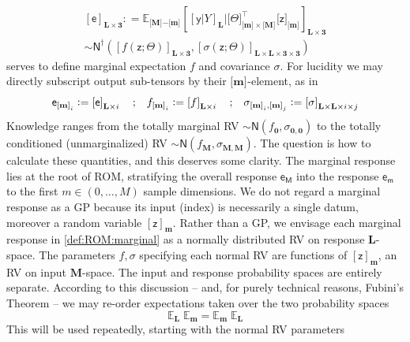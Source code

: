 \documentclass[preprint,12pt]{elsarticle}
\newcommand*{\M}[1]{\ensuremath{#1}\xspace}
\newcommand*{\x}{\times}
\newcommand*{\mi}[1]{\mathbf{#1}}
\newcommand*{\rv}[1]{\mathsf{#1}}
\newcommand*{\te}[2][]{\left\lbrack{#2}\right\rbrack_{#1}}
\newcommand*{\tte}[2][]{\lbrack{#2}\rbrack_{#1}}
\newcommand*{\tse}[2][]{\mi{\lbrack#2\rbrack}_{#1}}
\newcommand*{\tme}[3][]{\lbrack{#3}\rbrack_{\tse[#1]{#2}}}
\newcommand*{\deq}{\M{\mathrel{\mathop:}=}}
\newcommand{\T}[1]{\text{#1}}
\newcommand*{\QT}[2][]{\M{\quad\T{#2}\ifthenelse{\equal{#1}{}}{\quad}{#1}}}
\newcommand*{\evt}[3][]{\mathbb{E}_{#3}^{#1}\!#2}
\newcommand*{\tgauss}[2]{\mathsf{N}({#1,#2})}
\newcommand*{\gaussd}[2]{\mathsf{N}^{\dagger}\!\left({#1,#2}\right)}
\begin{document}
        \begin{multline} \label{def:ROM:marginal}
            \te[\mi{L\x \mi{3}}]{\rv{e}} \deq \evt{\te[\mi{L\x 3}]{\te[\mi{L}]{\rv{y} \vert Y}
            \big\vert \tte[\tse{m}\x\tse{M}]{\Theta}^{\intercal} \tme{m}{\rv{z}}}}{\tse{M}\mi{-}\tse{m}} \\
            \sim \gaussd{\te[\mi{L\x 3}]{f(\rv{z}; \Theta)}}
            {\te[\mi{L\x L\x 3\x 3}]{\sigma(\rv{z}; \Theta)}}
        \end{multline}
        serves to define marginal expectation $f$ and covariance $\sigma$.
        For lucidity we may directly subscript output sub-tensors by their $\tse{m}$-element, as in
        \begin{equation*}
            {\rv{e}_{\tse[i]{m}}}\deq \te[\mi{L}\x i]{\rv{e}} \QT{;}
            {f_{\tse[i]{m}}}\deq \te[\mi{L}\x i]{f} \QT{;}
            {\sigma_{\tse[i]{m},\tse[j]{m}}}\deq \te[\mi{L}\x\mi{L}\x i\x j]{\sigma}
        \end{equation*}
        Knowledge ranges from the totally marginal RV $\sim \tgauss{f_{\mi{0}}}
        {\sigma_{\mi{0},\mi{0}}}$ to the totally conditioned (unmarginalized) RV $\sim \tgauss{f_{\mi{M}}}{\sigma_{\mi{M},\mi{M}}}$. The question is how to calculate these quantities, and this deserves some clarity.
        The marginal response lies at the root of ROM, stratifying the overall response $\rv{e_{M}}$ into the response $\rv{e_{m}}$ to the first $m \in (0,\ldots,M)$ sample dimensions. We do not regard a marginal response as a GP because its input (index) is necessarily a single datum, moreover a random variable $\te[\mi{m}]{\rv{z}}$. Rather than a GP, we envisage each marginal response in \cref{def:ROM:marginal} as a normally distributed RV on response $\mi{L}$-space. The parameters $f,\sigma$ specifying each normal RV are functions of $\te[\mi{m}]{\rv{z}}$, an RV on input $\mi{M}$-space. The input and response probability spaces are entirely separate.
        According to this discussion -- and, for purely technical reasons, Fubini's Theorem -- we may re-order expectations taken over the two probability spaces
        \begin{equation*}
            \evt{\;\evt{}{\mi{m}}}{\mi{L}} = \evt{\;\evt{}{\mi{L}}}{\mi{m}}
        \end{equation*}
        This will be used repeatedly, starting with the normal RV parameters
\end{document}
